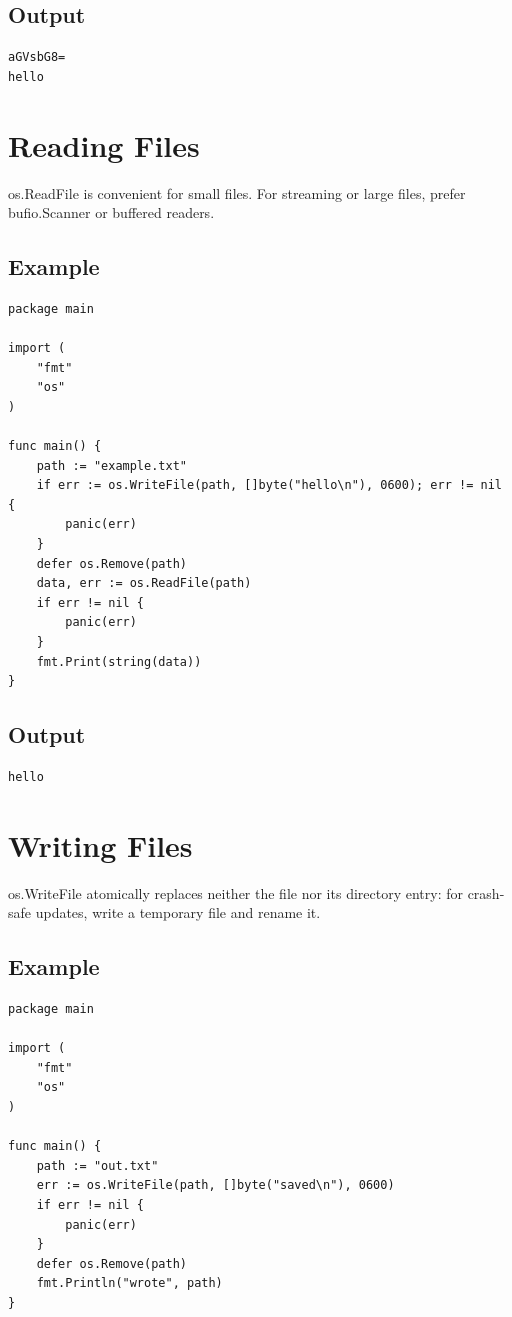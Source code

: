 \documentclass[10pt,oneside]{article}
\newcommand{\sectionline}{\par\vspace{4pt}{\color{rule}\hrule height .5pt}\vspace{7pt}\color{ink}\noindent}
\begin{document}
\subsection*{Output}
\begin{lstlisting}[style=terminal]
aGVsbG8=
hello
\end{lstlisting}
\clearpage
\section{Reading Files}
\sectionline
os.ReadFile is convenient for small files. For streaming or large files, prefer bufio.Scanner or buffered readers.\par
\subsection*{Example}
\begin{lstlisting}[style=gocode]
package main

import (
	"fmt"
	"os"
)

func main() {
	path := "example.txt"
	if err := os.WriteFile(path, []byte("hello\n"), 0600); err != nil {
		panic(err)
	}
	defer os.Remove(path)
	data, err := os.ReadFile(path)
	if err != nil {
		panic(err)
	}
	fmt.Print(string(data))
}
\end{lstlisting}
\subsection*{Output}
\begin{lstlisting}[style=terminal]
hello
\end{lstlisting}
\clearpage
\section{Writing Files}
\sectionline
os.WriteFile atomically replaces neither the file nor its directory entry: for crash-safe updates, write a temporary file and rename it.\par
\subsection*{Example}
\begin{lstlisting}[style=gocode]
package main

import (
	"fmt"
	"os"
)

func main() {
	path := "out.txt"
	err := os.WriteFile(path, []byte("saved\n"), 0600)
	if err != nil {
		panic(err)
	}
	defer os.Remove(path)
	fmt.Println("wrote", path)
}
\end{lstlisting}
\end{document}
